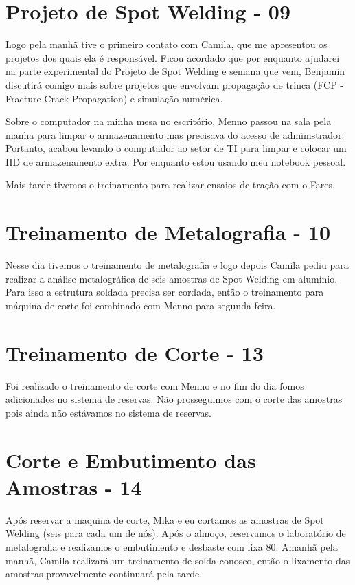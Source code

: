 \section{Projeto de Spot Welding - 09}
Logo pela manhã tive o primeiro contato com Camila, que me apresentou os projetos dos quais ela é responsável. Ficou acordado que por enquanto ajudarei na parte experimental do Projeto de Spot Welding e semana que vem, Benjamin discutirá comigo mais sobre projetos que envolvam propagação de trinca (FCP - Fracture Crack Propagation) e simulação numérica.

Sobre o computador na minha mesa no escritório, Menno passou na sala pela manha para limpar o armazenamento mas precisava do acesso de administrador. Portanto, acabou levando o computador ao setor de TI para limpar e colocar um HD de armazenamento extra. Por enquanto estou usando meu notebook pessoal.

Mais tarde tivemos o treinamento para realizar ensaios de tração com o Fares.

\section{Treinamento de Metalografia - 10}
Nesse dia tivemos o treinamento de metalografia e logo depois Camila pediu para realizar a análise metalográfica de seis amostras de Spot Welding em alumínio. Para isso a estrutura soldada precisa ser cordada, então o treinamento para máquina de corte foi combinado com Menno para segunda-feira.

\section{Treinamento de Corte - 13}
Foi realizado o treinamento de corte com Menno e no fim do dia fomos adicionados no sistema de reservas. Não prosseguimos com o corte das amostras pois ainda não estávamos no sistema de reservas.

\section{Corte e Embutimento das Amostras - 14}
Após reservar a maquina de corte, Mika e eu cortamos as amostras de Spot Welding (seis para cada um de nós). Após o almoço, reservamos o laboratório de metalografia e realizamos o embutimento e desbaste com lixa 80. Amanhã pela manhã, Camila realizará um treinamento de solda conosco, então o lixamento das amostras provavelmente continuará pela tarde.

